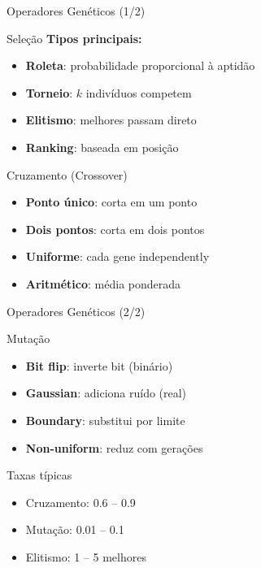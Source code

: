 \begin{frame}{Operadores Genéticos (1/2)}
\begin{block}{Seleção}
\textbf{Tipos principais:}
\begin{itemize}
    \item \textbf{Roleta}: probabilidade proporcional à aptidão
    \item \textbf{Torneio}: $k$ indivíduos competem
    \item \textbf{Elitismo}: melhores passam direto
    \item \textbf{Ranking}: baseada em posição
\end{itemize}
\end{block}

\vspace{0.3cm}
\begin{block}{Cruzamento (Crossover)}
\begin{itemize}
    \item \textbf{Ponto único}: corta em um ponto
    \item \textbf{Dois pontos}: corta em dois pontos
    \item \textbf{Uniforme}: cada gene independently
    \item \textbf{Aritmético}: média ponderada
\end{itemize}
\end{block}
\end{frame}

\begin{frame}{Operadores Genéticos (2/2)}
\begin{block}{Mutação}
\begin{itemize}
    \item \textbf{Bit flip}: inverte bit (binário)
    \item \textbf{Gaussian}: adiciona ruído (real)
    \item \textbf{Boundary}: substitui por limite
    \item \textbf{Non-uniform}: reduz com gerações
\end{itemize}
\end{block}

\vspace{0.3cm}
\begin{block}{Taxas típicas}
\begin{itemize}
    \item Cruzamento: 0.6 -- 0.9
    \item Mutação: 0.01 -- 0.1
    \item Elitismo: 1 -- 5 melhores
\end{itemize}
\end{block}
\end{frame}

